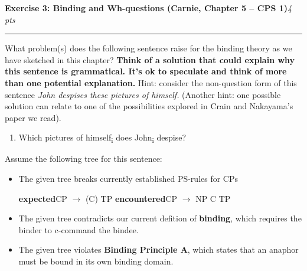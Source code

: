 \documentclass[12pt,letterpaper]{article}
\newcommand{\npi}[1][i]{\textsubscript{#1}}
\newcommand{\qtl}[1]{\strut #1}
\newcommand{\exercise}[2]{
	\par{\large\bfseries #1}\hfill\emph{#2 pts}
	\par\vspace*{-2ex}\rule{\linewidth}{0.1pt}
	\par\vspace*{1.5ex}
}
\begin{document}
\newpage\exercise{Exercise 3: Binding and Wh-questions (Carnie, Chapter 5 -- CPS 1)}{4}

What problem(s) does the following sentence raise for the binding theory as we have sketched in
this chapter? \textbf{Think of a solution that could explain why this sentence is grammatical. It's
ok to speculate and think of more than one potential explanation.} Hint: consider the non-question
form of this sentence \emph{John despises these pictures of himself.} (Another hint: one possible
solution can relate to one of the possibilities explored in Crain and Nakayama's paper we read).

\begin{enumerate}[label=(\arabic*)]
	\item Which pictures of himself\npi{} does John\npi{} despise?
\end{enumerate}

Assume the following tree for this sentence:
\par\vspace*{3ex}
\hfill{}\hfill\null
\begin{itemize}[noitemsep]
	\item The given tree breaks currently established PS-rules for CPs
	\par\hfill
	\textbf{expected}\quad CP $\rightarrow$ (C) TP\hspace*{1cm}
	\textbf{encountered}\quad CP $\rightarrow$ NP C TP\hfill\null

	\item The given tree contradicts our current defition of \textbf{binding}, which requires
	      the binder to c-command the bindee.

	\item The given tree violates \textbf{Binding Principle A}, which states that an anaphor must be
	      bound in its own binding domain.
\end{itemize}
\hfill{}\hfill\null
\par\vspace*{3ex}
\end{document}
